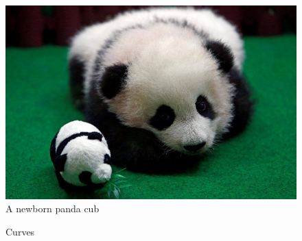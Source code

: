\lipsum[2]

\begin{figure}[ht]
	\centering
	\includegraphics[width = \textwidth]{Figures/Panda_Cub}
	\caption{A newborn panda cub}
\end{figure}

\lipsum[3]

\begin{figure}[ht]
	\centering
	
	\caption{Curves}
\end{figure}

\lipsum[4-5]

